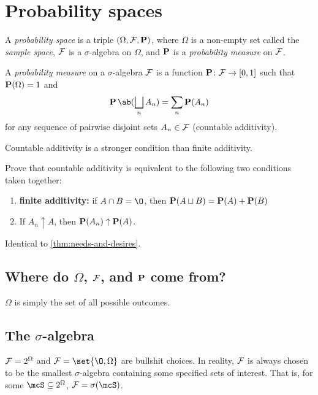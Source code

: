 \section{Probability spaces} \label{sec:prob}
\begin{definition*} \label{def:prob}
    A \emph{probability space} is a triple $(\Omega, \F, \P)$,
    where $\Omega$ is a non-empty set called the \emph{sample space},
    $\F$ is a $\sigma$-algebra on $\Omega$, and
    $\P$ is a \emph{probability measure} on $\F$.

    A \emph{probability measure} on a $\sigma$-algebra $\F$ is a function
    $\P\colon \F \to [0, 1]$ such that $\P(\Omega) = 1$ and \[
        \P\ab(\bigsqcup_n A_n) = \sum_n \P(A_n)
    \] for any sequence of pairwise disjoint sets $A_n \in \F$
    (countable additivity).
\end{definition*}
Countable additivity is a stronger condition than finite additivity.
\begin{exercise*} \label{thm:additivity}
    Prove that countable additivity is equivalent to the following two
    conditions taken together:
    \begin{enumerate}
        \item \textbf{finite additivity:} if $A \cap B = \O$, then
            $\P(A \sqcup B) = \P(A) + \P(B)$
        \item If $A_n \uparrow A$, then $\P(A_n) \uparrow \P(A)$.
    \end{enumerate}
\end{exercise*}
\begin{solution}
    Identical to \cref{thm:needs-and-desires}.
\end{solution}

\subsection*{Where do $\Omega$, $\F$, and $\P$ come from?}
$\Omega$ is simply the set of all possible outcomes.

\subsection{The $\sigma$-algebra}
$\F = 2^\Omega$ and $\F = \set{\O, \Omega}$ are bullshit choices.
In reality, $\F$ is always chosen to be the smallest $\sigma$-algebra
containing some specified sets of interest.
That is, for some $\mcS \subseteq 2^\Omega$, $\F = \sigma(\mcS)$.

